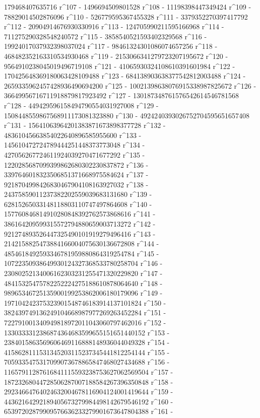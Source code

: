        179468407635716 r^107 - 1496694509801528 r^108 - 
       11198398447349424 r^109 - 78829014502876096 r^110 - 
       526779595367455328 r^111 - 3379352270397417792 r^112 - 
       20904914676930330916 r^113 - 124705990211595166968 r^114 - 
       711275290328548240572 r^115 - 3858540521593402329568 r^116 - 
       19924017037932398037024 r^117 - 
       98461324301086074657256 r^118 - 
       468482352163310534930468 r^119 - 
       2153066341279723207195672 r^120 - 
       9564910238045019496719108 r^121 - 
       41065930324108610391601984 r^122 - 
       170425648369180063428109488 r^123 - 
       684138903638377542812003488 r^124 - 
       2659335962457428936490694200 r^125 - 
       10021398638076915338987825672 r^126 - 
       36649956716711918879817923492 r^127 - 
       130187348761576542614546781568 r^128 - 
       449429596158494790554031927008 r^129 - 
       1508448559867568911173081323880 r^130 - 
       4924240393026752704595651657408 r^131 - 
       15641063964201383871673898377728 r^132 - 
       48361045663854022640896585955600 r^133 - 
       145610472724789444251448373773048 r^134 - 
       427056267724611924039270471677292 r^135 - 
       1220285687099399862680302230837872 r^136 - 
       3397646018323506851371668975584624 r^137 - 
       9218704998426830467904108163927032 r^138 - 
       24375859011237382202559039683131680 r^139 - 
       62815265033148118803110747497864608 r^140 - 
       157760846814910280848392762573868616 r^141 - 
       386164209599315572794880659003713272 r^142 - 
       921274893526447325490101919279496416 r^143 - 
       2142158825473884166004075630136672808 r^144 - 
       4854618492593346781959880864319254784 r^145 - 
       10722350938649930124327368533780258704 r^146 - 
       23080252134006162303231255471320229820 r^147 - 
       48415325475782252224275188610878064640 r^148 - 
       98965346725135900199253862006180179096 r^149 - 
       197104242375323901548746183914137101824 r^150 - 
       382439749136249104668987977269263452284 r^151 - 
       722791001340949818972011043060797462016 r^152 - 
       1330333312386874364683599655151651440152 r^153 - 
       2384015863569606469116888148936044049328 r^154 - 
       4158628111531345203115237345441812254144 r^155 - 
       7059335475317099073678865847468027434688 r^156 - 
       11657911287616841115593238753627062569504 r^157 - 
       18723268044728506287007188584267396350848 r^158 - 
       29234664764024632004678116904124001419644 r^159 - 
       44362164292189405673279984498142679546192 r^160 - 
       65397202879909576636233279901673647804388 r^161 - 
